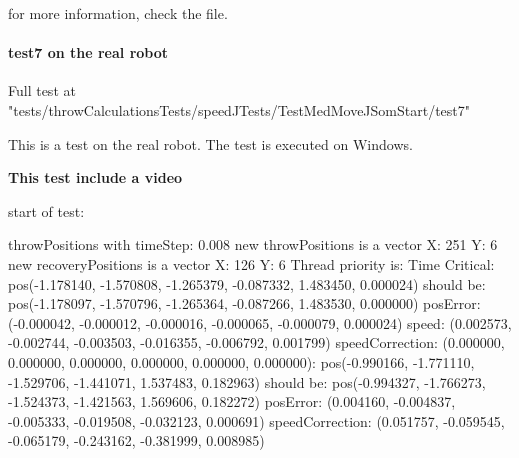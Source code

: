 for more information, check the file.\newline 

\paragraph{test7 on the real robot}
Full test at "tests/throwCalculationsTests/speedJTests/TestMedMoveJSomStart/test7"

This is a test on the real robot. The test is executed on Windows.

\textbf{This test include a video}

start of test: \newline 

throwPositions with timeStep:  0.008\newline
new throwPositions is a vector X: 251 Y:  6\newline
new recoveryPositions is a vector X: 126 Y:  6\newline
Thread priority is: Time Critical\newline
[0.000000s - Step 0/251]:\newline
\hspace{1cm}        pos(-1.178140, -1.570808, -1.265379, -0.087332, 1.483450, 0.000024) should be:\newline
\hspace{1cm}        pos(-1.178097, -1.570796, -1.265364, -0.087266, 1.483530, 0.000000)\newline
\hspace{1cm}        posError: (-0.000042, -0.000012, -0.000016, -0.000065, -0.000079, 0.000024)\newline
\hspace{1cm}        speed: (0.002573, -0.002744, -0.003503, -0.016355, -0.006792, 0.001799)\newline
\hspace{1cm}        speedCorrection: (0.000000, 0.000000, 0.000000, 0.000000, 0.000000, 0.000000)\newline
[2.000000s - Step 250/251]:\newline
\hspace{1cm}        pos(-0.990166, -1.771110, -1.529706, -1.441071, 1.537483, 0.182963) should be:\newline
\hspace{1cm}        pos(-0.994327, -1.766273, -1.524373, -1.421563, 1.569606, 0.182272)\newline
\hspace{1cm}        posError: (0.004160, -0.004837, -0.005333, -0.019508, -0.032123, 0.000691)\newline
\hspace{1cm}        speedCorrection: (0.051757, -0.059545, -0.065179, -0.243162, -0.381999, 0.008985)\newline

